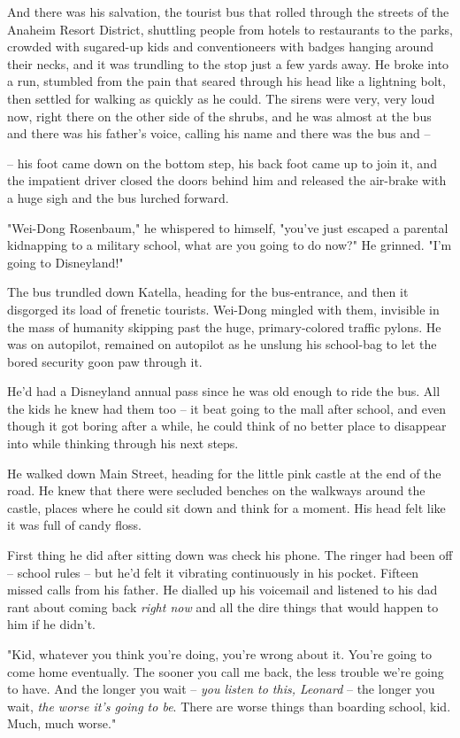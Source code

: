 And there was his salvation, the tourist bus that rolled through
the streets of the Anaheim Resort District, shuttling people from
hotels to restaurants to the parks, crowded with sugared-up kids
and conventioneers with badges hanging around their necks, and it
was trundling to the stop just a few yards away. He broke into a
run, stumbled from the pain that seared through his head like a
lightning bolt, then settled for walking as quickly as he could.
The sirens were very, very loud now, right there on the other side
of the shrubs, and he was almost at the bus and there was his
father's voice, calling his name and there was the bus and --

-- his foot came down on the bottom step, his back foot came up to
join it, and the impatient driver closed the doors behind him and
released the air-brake with a huge sigh and the bus lurched
forward.

"Wei-Dong Rosenbaum," he whispered to himself, "you've just escaped
a parental kidnapping to a military school, what are you going to
do now?" He grinned. "I'm going to Disneyland!"

The bus trundled down Katella, heading for the bus-entrance, and
then it disgorged its load of frenetic tourists. Wei-Dong mingled
with them, invisible in the mass of humanity skipping past the
huge, primary-colored traffic pylons. He was on autopilot, remained
on autopilot as he unslung his school-bag to let the bored security
goon paw through it.

He'd had a Disneyland annual pass since he was old enough to ride
the bus. All the kids he knew had them too -- it beat going to the
mall after school, and even though it got boring after a while, he
could think of no better place to disappear into while thinking
through his next steps.

He walked down Main Street, heading for the little pink castle at
the end of the road. He knew that there were secluded benches on
the walkways around the castle, places where he could sit down and
think for a moment. His head felt like it was full of candy floss.

First thing he did after sitting down was check his phone. The
ringer had been off -- school rules -- but he'd felt it vibrating
continuously in his pocket. Fifteen missed calls from his father.
He dialled up his voicemail and listened to his dad rant about
coming back \emph{right now} and all the dire things that would
happen to him if he didn't.

"Kid, whatever you think you're doing, you're wrong about it.
You're going to come home eventually. The sooner you call me back,
the less trouble we're going to have. And the longer you wait --
\emph{you listen to this, Leonard} -- the longer you wait,
\emph{the worse it's going to be}. There are worse things than
boarding school, kid. Much, much worse."

